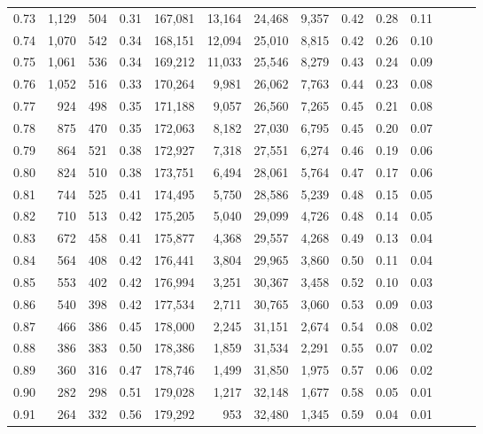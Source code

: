 \begin{tabular}{rrrrrrrrrrrrrr}
0.73 &  1,129 &  504 &  0.31 &  167,081 &   13,164 &  24,468 &   9,357 &  0.42 &  0.28 &      0.11 \\
0.74 &  1,070 &  542 &  0.34 &  168,151 &   12,094 &  25,010 &   8,815 &  0.42 &  0.26 &      0.10 \\
0.75 &  1,061 &  536 &  0.34 &  169,212 &   11,033 &  25,546 &   8,279 &  0.43 &  0.24 &      0.09 \\
0.76 &  1,052 &  516 &  0.33 &  170,264 &    9,981 &  26,062 &   7,763 &  0.44 &  0.23 &      0.08 \\
0.77 &    924 &  498 &  0.35 &  171,188 &    9,057 &  26,560 &   7,265 &  0.45 &  0.21 &      0.08 \\
0.78 &    875 &  470 &  0.35 &  172,063 &    8,182 &  27,030 &   6,795 &  0.45 &  0.20 &      0.07 \\
0.79 &    864 &  521 &  0.38 &  172,927 &    7,318 &  27,551 &   6,274 &  0.46 &  0.19 &      0.06 \\
0.80 &    824 &  510 &  0.38 &  173,751 &    6,494 &  28,061 &   5,764 &  0.47 &  0.17 &      0.06 \\
0.81 &    744 &  525 &  0.41 &  174,495 &    5,750 &  28,586 &   5,239 &  0.48 &  0.15 &      0.05 \\
0.82 &    710 &  513 &  0.42 &  175,205 &    5,040 &  29,099 &   4,726 &  0.48 &  0.14 &      0.05 \\
0.83 &    672 &  458 &  0.41 &  175,877 &    4,368 &  29,557 &   4,268 &  0.49 &  0.13 &      0.04 \\
0.84 &    564 &  408 &  0.42 &  176,441 &    3,804 &  29,965 &   3,860 &  0.50 &  0.11 &      0.04 \\
0.85 &    553 &  402 &  0.42 &  176,994 &    3,251 &  30,367 &   3,458 &  0.52 &  0.10 &      0.03 \\
0.86 &    540 &  398 &  0.42 &  177,534 &    2,711 &  30,765 &   3,060 &  0.53 &  0.09 &      0.03 \\
0.87 &    466 &  386 &  0.45 &  178,000 &    2,245 &  31,151 &   2,674 &  0.54 &  0.08 &      0.02 \\
0.88 &    386 &  383 &  0.50 &  178,386 &    1,859 &  31,534 &   2,291 &  0.55 &  0.07 &      0.02 \\
0.89 &    360 &  316 &  0.47 &  178,746 &    1,499 &  31,850 &   1,975 &  0.57 &  0.06 &      0.02 \\
0.90 &    282 &  298 &  0.51 &  179,028 &    1,217 &  32,148 &   1,677 &  0.58 &  0.05 &      0.01 \\
0.91 &    264 &  332 &  0.56 &  179,292 &      953 &  32,480 &   1,345 &  0.59 &  0.04 &      0.01 \\

\end{tabular}
